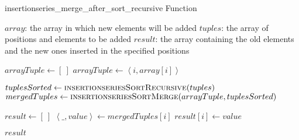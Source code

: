         \begin{frame}[containsverbatim]{\insertionseriesmergeaftersortrecursivefunctionframe}
            \begingroup
                \makeatletter
                \renewcommand{\alglinenumber}[1]{\tiny#1}
                \makeatother
                \begin{algorithm}[H]
                    \tiny
                    \caption{insertionseries\_merge\_after\_sort\_recursive Function} \label{insertionseries_merge_after_sort_recursive function}
                    \begin{algorithmic}[1]
                        \Require 
                            \Statex $array$: the array in which new elements will be added
                            \Statex $tuples$: the array of positions and elements to be added
                        \Ensure
                            \Statex $result$: the array containing the old elements and the new ones inserted in the specified positions
                        \Statex
        
                            \State $arrayTuple \gets \left[\ \right]$
                                \State $arrayTuple \gets \left<i, array{\left[i\right]}\right>$
                            \EndFor
        
                            \State $tuplesSorted \gets \Call{insertionseriesSortRecursive}{tuples}$
                            \State $mergedTuples \gets \Call{insertionseriesSortMerge}{arrayTuple, tuplesSorted}$
        
                            \State $result \gets \left[\ \right]$
                                \State $\left<\_, value\right> \gets mergedTuples{\left[i\right]}$
                                \State $result{\left[i\right]} \gets value$
                            \EndFor
        
                            \State \Return $result$
                        \EndFunction
                    \end{algorithmic}
                \end{algorithm}
            \endgroup
        \end{frame}

